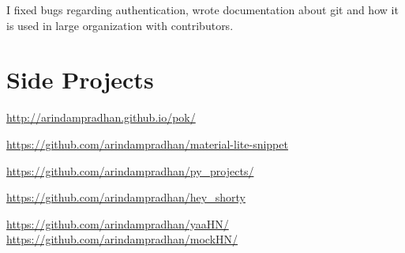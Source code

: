 \documentclass[]{deedy-resume-openfont}
\begin{document}
\begin{minipage}[t]{0.66\textwidth}
\vspace{\topsep} %
\begin{tightemize}
\item I fixed bugs regarding authentication, wrote documentation about git and how it is used in large organization with contributors.\end{tightemize}
\sectionsep


\section{Side Projects}

{ \url{http://arindampradhan.github.io/pok/} }\\
\sectionsep

{ \url{https://github.com/arindampradhan/material-lite-snippet} }\\
\sectionsep

{ \url{https://github.com/arindampradhan/py_projects/} }\\
\sectionsep

{ \url{https://github.com/arindampradhan/hey_shorty} }\\
\sectionsep

{ \url{https://github.com/arindampradhan/yaaHN/} }\\
{ \url{https://github.com/arindampradhan/mockHN/} }\\
\sectionsep


\end{minipage}
\end{document}

